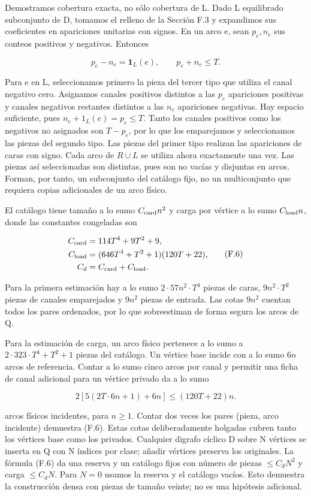 \documentclass[spanish,11pt,a4paper]{article}
\begin{document}
Demostramos cobertura exacta, no sólo cobertura de L. Dado L equilibrado subconjunto de D, tomamos el relleno de la Sección F.3 y expandimos sus coeficientes en apariciones unitarias con signos. En un arco e, sean \(p_{e},n_{e}\) sus conteos positivos y negativos. Entonces

\[p_e-n_e=\mathbf1_L(e),\qquad p_e+n_e\le T.\]

Para e en L, seleccionamos primero la pieza del tercer tipo que utiliza el canal negativo cero. Asignamos canales positivos distintos a las \(p_{e}\) apariciones positivas y canales negativos restantes distintos a las \(n_{e}\) apariciones negativas. Hay espacio suficiente, pues \(n_{e}+1_{L}(e)=p_{e}\le T\). Tanto los canales positivos como los negativos no asignados son \(T-p_{e}\), por lo que los emparejamos y seleccionamos las piezas del segundo tipo. Las piezas del primer tipo realizan las apariciones de caras con signo. Cada arco de \(R\cup L\) se utiliza ahora exactamente una vez. Las piezas así seleccionadas son distintas, pues son no vacías y disjuntas en arcos. Forman, por tanto, un subconjunto del catálogo fijo, no un multiconjunto que requiera copias adicionales de un arco físico.

El catálogo tiene tamaño a lo sumo \(C_{\rm card}n^2\) y carga por vértice a lo sumo \(C_{\rm load}n\), donde las constantes congeladas son

\[\begin{aligned}C_{\rm card}&=114T^4+9T^2+9,\\C_{\rm load}&=(646T^4+T^2+1)(120T+22),\\C_d&=C_{\rm card}+C_{\rm load}.\end{aligned}\tag{F.6}\]

Para la primera estimación hay a lo sumo \(2\cdot 57n^{2}\cdot T^{4}\) piezas de caras, \(9n^{2}\cdot T^{2}\) piezas de canales emparejados y \(9n^{2}\) piezas de entrada. Las cotas \(9n^{2}\) cuentan todos los pares ordenados, por lo que sobreestiman de forma segura los arcos de Q.

Para la estimación de carga, un arco físico pertenece a lo sumo a \(2\cdot 323\cdot T^{4}+T^{2}+1\) piezas del catálogo. Un vértice base incide con a lo sumo \(6n\) arcos de referencia. Contar a lo sumo cinco arcos por canal y permitir una ficha de canal adicional para un vértice privado da a lo sumo

\[2[5(2T\cdot6n+1)+6n]\le(120T+22)n.\]

arcos físicos incidentes, para \(n\ge 1\). Contar dos veces los pares (pieza, arco incidente) demuestra (F.6). Estas cotas deliberadamente holgadas cubren tanto los vértices base como los privados. Cualquier digrafo cíclico D sobre N vértices se inserta en Q con N índices por clase; añadir vértices preserva los originales. La fórmula (F.6) da una reserva y un catálogo fijos con número de piezas \(\le C_dN^2\) y carga \(\le C_dN\). Para \(N=0\) usamos la reserva y el catálogo vacíos. Esto demuestra la construcción densa con piezas de tamaño veinte; no es una hipótesis adicional.
\end{document}
